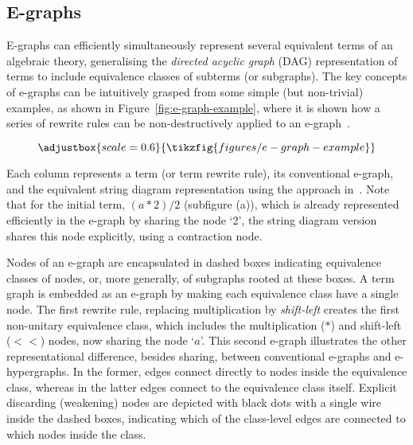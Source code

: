 \documentclass[]{IEEEtran}
\begin{document}
\subsection{E-graphs}

E-graphs can efficiently simultaneously represent several equivalent terms of an algebraic theory, generalising the \textit{directed acyclic graph} (DAG) representation of terms to include equivalence classes of subterms (or subgraphs).
The key concepts of e-graphs can be intuitively grasped from some simple (but non-trivial) examples, as shown in Figure~\ref{fig:e-graph-example}, where it is shown how a series of rewrite rules can be non-destructively applied to an e-graph~\cite{EggPaper}.

\begin{figure*}[h!]
\[
\adjustbox{scale=0.6}{
\tikzfig{figures/e-graph-example}
}
\]
\caption{E-graph example (top) and its equivalent string diagram representation (bottom)}
\label{fig:e-graph-example}
\end{figure*}

Each column represents a term (or term rewrite rule), its conventional e-graph, and the equivalent string diagram representation using the approach in~\cite{ghica2024equivalencehypergraphsegraphsmonoidal}. 
Note that for the initial term, $(a*2)/2$ (subfigure (a)), which is already represented efficiently in the e-graph by sharing the node `2', the string diagram version shares this node explicitly, using a contraction node.

Nodes of an e-graph are encapsulated in dashed boxes indicating equivalence classes of nodes, or, more generally, of subgraphs rooted at these boxes.
A term graph is embedded as an e-graph by making each equivalence class have a single node.
The first rewrite rule, replacing multiplication by \emph{shift-left} creates the first non-unitary equivalence class, which includes the multiplication ($*$) and shift-left ($<\!\!<$) nodes,  now sharing the node `$a$'.
This second e-graph illustrates the other representational difference, besides sharing, between conventional e-graphs and e-hypergraphs.
In the former, edges connect directly to nodes inside the equivalence class, whereas in the latter edges connect to the equivalence class itself.
Explicit discarding (weakening) nodes are depicted with black dots with a single wire
inside the dashed boxes, indicating which of the class-level edges are connected to which nodes inside the class.
\end{document}
